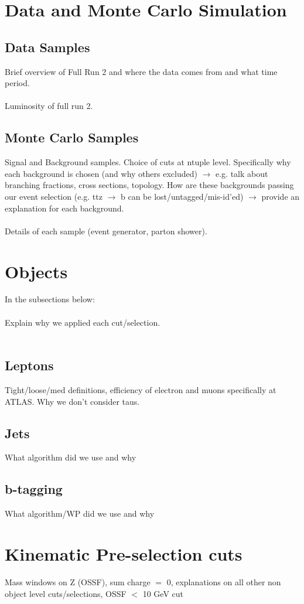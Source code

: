 
\section{Data and Monte Carlo Simulation}
\subsection{Data Samples}
Brief overview of Full Run 2 and where the data comes from and what time period.\\\\
Luminosity of full run 2. 

\subsection{Monte Carlo Samples}
Signal and Background samples. Choice of cuts at ntuple level. Specifically why each background is chosen (and why others excluded) $\rightarrow$ e.g. talk about branching fractions, cross sections, topology. How are these backgrounds passing our event selection (e.g. ttz $\rightarrow$ b can be lost/untagged/mis-id'ed) $\rightarrow$ provide an explanation for each background.\\\\
Details of each sample (event generator, parton shower).

\section{Objects}
In the subsections below:\\\\
Explain why we applied each cut/selection.\\\\


\subsection{Leptons}
Tight/loose/med definitions, efficiency of electron and muons specifically at ATLAS. Why we don't consider taus.
\subsection{Jets}
What algorithm did we use and why
\subsection{b-tagging}
What algorithm/WP did we use and why
\section{Kinematic Pre-selection cuts}
Mass windows on Z (OSSF), sum charge $=$ 0, explanations on all other non object level cuts/selections, OSSF $<$ 10 GeV cut
